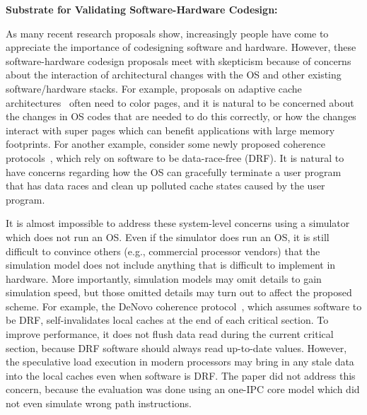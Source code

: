 \documentclass[conference]{IEEEtran}
\begin{document}
\noindent\textbf{Substrate for Validating Software-Hardware Codesign:}
\begin{comment}
When improving the PPA of processors, hardware changes that are transparent to software are most welcome, and if the benefits are high enough, they can be absorbed into commercial designs gradually.
However, with the end of Moore's law, hardware designs are facing more and more critical constraints, and it has become very difficult to come up with such transparent hardware changes to improve PPA.
\end{comment}
As many recent research proposals show, increasingly people have come to appreciate the importance of codesigning software and hardware.
However, these software-hardware codesign proposals meet with skepticism because of concerns about the interaction of architectural changes with the OS and other existing software/hardware stacks.
For example, proposals on adaptive cache architectures~\cite{Jigsaw} often need to color pages, and it is natural to be concerned about the changes in OS codes that are needed to do this correctly, or how the changes interact with super pages which can benefit applications with large memory footprints.
For another example, consider some newly proposed coherence protocols~\cite{DeNoVo}, which rely on software to be data-race-free (DRF). It is natural to have concerns regarding how the OS can gracefully terminate a user program that has data races and clean up polluted cache states caused by the user program.

It is almost impossible to address these system-level concerns using a simulator which does not run an OS.
Even if the simulator does run an OS, it is still difficult to convince others (e.g., commercial processor vendors) that the simulation model does not include anything that is difficult to implement in hardware.
More importantly, simulation models may omit details to gain simulation speed, but those omitted details may turn out to affect the proposed scheme.
For example, the DeNovo coherence protocol~\cite{DeNoVo}, which assumes software to be DRF, self-invalidates local caches at the end of each critical section.
To improve performance, it does not flush data read during the current critical section, because DRF software should always read up-to-date values.
However, the speculative load execution in modern processors may bring in any stale data into the local caches even when software is DRF.
The paper did not address this concern, because the evaluation was done using an one-IPC core model which did not even simulate wrong path instructions.
\end{document}
